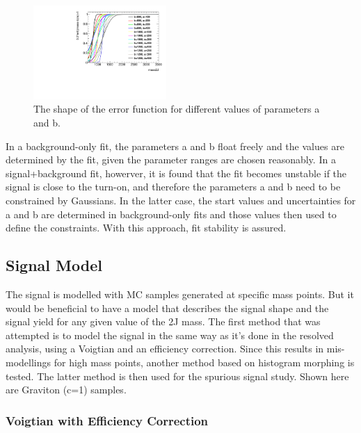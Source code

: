 \begin{figure}[htbp!]
\begin{center}
\includegraphics[angle=270, width=0.45\textwidth]{./figures/boosted/app-directfit/erf_parameters.pdf}
\caption{The shape of the error function for different values of parameters a and b.}
\label{fig:directfit:erf}
\end{center}
\end{figure}

In a background-only fit, the parameters a and b float freely and the values are determined by the fit, given the parameter ranges are chosen reasonably. In a signal+background fit, howerver, it is found that the fit becomes unstable if the signal is close to the turn-on, and therefore the parameters a and b need to be constrained by Gaussians. In the latter case, the start values and uncertainties for a and b are determined in background-only fits and those values then used to define the constraints. With this approach, fit stability is assured.

\subsection{Signal Model}

The signal is modelled with MC samples generated at specific mass points. But it would be beneficial to have a model that describes the signal shape and the signal yield for any given value of the 2J mass. The first method that was attempted is to model the signal in the same way as it's done in the resolved analysis, using a Voigtian and an efficiency correction. Since this results in mis-modellings for high mass points, another method based on histogram morphing is tested. The latter method is then used for the spurious signal study. Shown here are Graviton (c=1) samples.

\subsubsection{Voigtian with Efficiency Correction}


